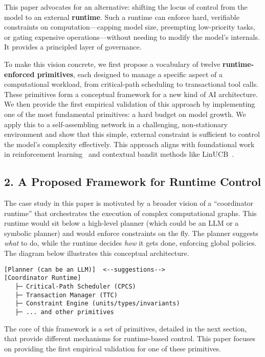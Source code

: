 \documentclass[
]{article}
\begin{document}
This paper advocates for an alternative: shifting the locus of control
from the model to an external \textbf{runtime}. Such a runtime can
enforce hard, verifiable constraints on computation---capping model
size, preempting low-priority tasks, or gating expensive
operations---without needing to modify the model's internals. It
provides a principled layer of governance.

To make this vision concrete, we first propose a vocabulary of twelve
\textbf{runtime-enforced primitives}, each designed to manage a specific
aspect of a computational workload, from critical-path scheduling to
transactional tool calls. These primitives form a conceptual framework
for a new kind of AI architecture. We then provide the first empirical
validation of this approach by implementing one of the most fundamental
primitives: a hard budget on model growth. We apply this to a
self-assembling network in a challenging, non-stationary environment and
show that this simple, external constraint is sufficient to control the
model's complexity effectively.
This approach aligns with foundational work in reinforcement learning~\cite{SuttonBarto2018} and contextual bandit methods like LinUCB~\cite{Auer2002}.

\hypertarget{a-proposed-framework-for-runtime-control}{%
\subsection{2. A Proposed Framework for Runtime
Control}\label{a-proposed-framework-for-runtime-control}}

The case study in this paper is motivated by a broader vision of a
``coordinator runtime'' that orchestrates the execution of complex
computational graphs. This runtime would sit below a high-level planner
(which could be an LLM or a symbolic planner) and would enforce
constraints on the fly. The planner suggests \emph{what} to do, while
the runtime decides \emph{how} it gets done, enforcing global policies.
The diagram below illustrates this conceptual architecture.

\begin{verbatim}
[Planner (can be an LLM)]  <--suggestions-->
[Coordinator Runtime]
   ├─ Critical-Path Scheduler (CPCS)
   ├─ Transaction Manager (TTC)
   ├─ Constraint Engine (units/types/invariants)
   ├─ ... and other primitives
\end{verbatim}

The core of this framework is a set of primitives, detailed in the next
section, that provide different mechanisms for runtime-based control.
This paper focuses on providing the first empirical validation for one
of these primitives.
\end{document}
